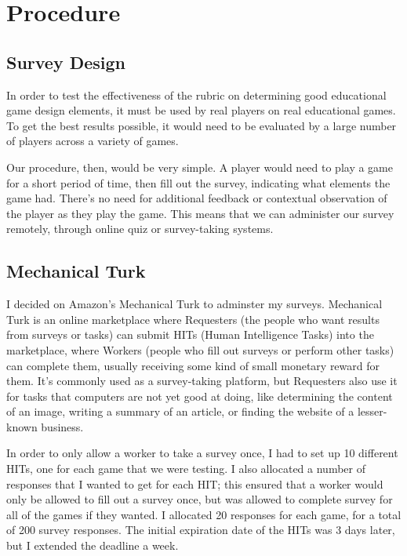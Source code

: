 \chapter{Procedure}
	\section{Survey Design}
		In order to test the effectiveness of the rubric on determining good educational game design elements, it must be used by real players on real educational games. To get the best results possible, it would need to be evaluated by a large number of players across a variety of games.

		Our procedure, then, would be very simple. A player would need to play a game for a short period of time, then fill out the survey, indicating what elements the game had. There's no need for additional feedback or contextual observation of the player as they play the game. This means that we can administer our survey remotely, through online quiz or survey-taking systems.

	\section{Mechanical Turk}
		I decided on Amazon's Mechanical Turk to adminster my surveys. Mechanical Turk is an online marketplace where Requesters (the people who want results from surveys or tasks) can submit HITs (Human Intelligence Tasks) into the marketplace, where Workers (people who fill out surveys or perform other tasks) can complete them, usually receiving some kind of small monetary reward for them. It's commonly used as a survey-taking platform, but Requesters also use it for tasks that computers are not yet good at doing, like determining the content of an image, writing a summary of an article, or finding the website of a lesser-known business.


		In order to only allow a worker to take a survey once, I had to set up 10 different HITs, one for each game that we were testing. I also allocated a number of responses that I wanted to get for each HIT; this ensured that a worker would only be allowed to fill out a survey once, but was allowed to complete survey for all of the games if they wanted. I allocated 20 responses for each game, for a total of 200 survey responses. The initial expiration date of the HITs was 3 days later, but I extended the deadline a week. 

